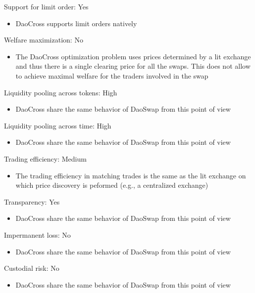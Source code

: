 \documentclass[11pt, reqno]{amsart}
\theoremstyle{definition}
\theoremstyle{remark}
\begin{document}
	\item Support for limit order: Yes
	      \begin{itemize}
		      \item DaoCross supports limit orders natively
	      \end{itemize}
	\item Welfare maximization: No
	      \begin{itemize}
		      \item The DaoCross optimization problem uses prices determined by
                a lit exchange and thus there is a single clearing price for all
                the swaps. This does not allow to achieve maximal welfare for
                the traders involved in the swap
	      \end{itemize}
	\item Liquidity pooling across tokens: High
	      \begin{itemize}
		      \item DaoCross share the same behavior of DaoSwap from this point of view
	      \end{itemize}
	\item Liquidity pooling across time: High
	      \begin{itemize}
		      \item DaoCross share the same behavior of DaoSwap from this point of view
	      \end{itemize}
	\item Trading efficiency: Medium
	      \begin{itemize}
              \item The trading efficiency in matching trades is the same as the
                lit exchange on which price discovery is peformed (e.g., a
                centralized exchange)
	      \end{itemize}
	\item Transparency: Yes
	      \begin{itemize}
		      \item DaoCross share the same behavior of DaoSwap from this point of view
	      \end{itemize}
	\item Impermanent loss: No
	      \begin{itemize}
		      \item DaoCross share the same behavior of DaoSwap from this point of view
	      \end{itemize}
	\item Custodial risk: No
	      \begin{itemize}
		      \item DaoCross share the same behavior of DaoSwap from this point of view
	      \end{itemize}
\end{document}
